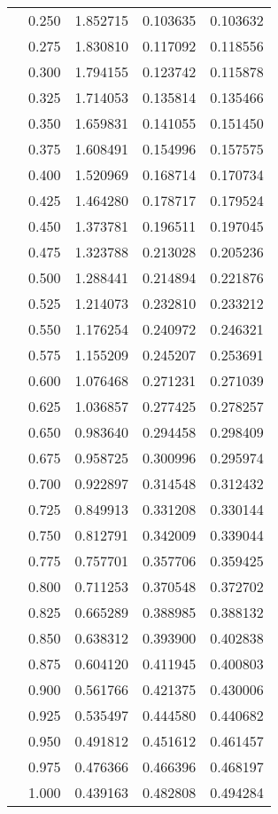 \begin{tabular}{llrrr}
         & 0.250 &   1.852715 &   0.103635 &   0.103632 \\
         & 0.275 &   1.830810 &   0.117092 &   0.118556 \\
         & 0.300 &   1.794155 &   0.123742 &   0.115878 \\
         & 0.325 &   1.714053 &   0.135814 &   0.135466 \\
         & 0.350 &   1.659831 &   0.141055 &   0.151450 \\
         & 0.375 &   1.608491 &   0.154996 &   0.157575 \\
         & 0.400 &   1.520969 &   0.168714 &   0.170734 \\
         & 0.425 &   1.464280 &   0.178717 &   0.179524 \\
         & 0.450 &   1.373781 &   0.196511 &   0.197045 \\
         & 0.475 &   1.323788 &   0.213028 &   0.205236 \\
         & 0.500 &   1.288441 &   0.214894 &   0.221876 \\
         & 0.525 &   1.214073 &   0.232810 &   0.233212 \\
         & 0.550 &   1.176254 &   0.240972 &   0.246321 \\
         & 0.575 &   1.155209 &   0.245207 &   0.253691 \\
         & 0.600 &   1.076468 &   0.271231 &   0.271039 \\
         & 0.625 &   1.036857 &   0.277425 &   0.278257 \\
         & 0.650 &   0.983640 &   0.294458 &   0.298409 \\
         & 0.675 &   0.958725 &   0.300996 &   0.295974 \\
         & 0.700 &   0.922897 &   0.314548 &   0.312432 \\
         & 0.725 &   0.849913 &   0.331208 &   0.330144 \\
         & 0.750 &   0.812791 &   0.342009 &   0.339044 \\
         & 0.775 &   0.757701 &   0.357706 &   0.359425 \\
         & 0.800 &   0.711253 &   0.370548 &   0.372702 \\
         & 0.825 &   0.665289 &   0.388985 &   0.388132 \\
         & 0.850 &   0.638312 &   0.393900 &   0.402838 \\
         & 0.875 &   0.604120 &   0.411945 &   0.400803 \\
         & 0.900 &   0.561766 &   0.421375 &   0.430006 \\
         & 0.925 &   0.535497 &   0.444580 &   0.440682 \\
         & 0.950 &   0.491812 &   0.451612 &   0.461457 \\
         & 0.975 &   0.476366 &   0.466396 &   0.468197 \\
         & 1.000 &   0.439163 &   0.482808 &   0.494284 \\
\bottomrule
\end{tabular}
